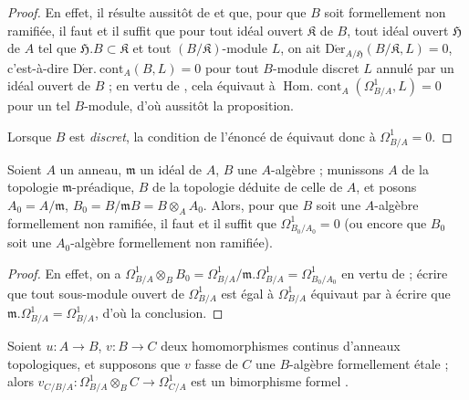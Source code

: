 \begin{proof}
En effet, il résulte aussitôt de  et
 que, pour que $B$ soit formellement non ramifiée, il faut et
il suffit que pour tout idéal ouvert $\mathfrak{K}$ de $B$, tout idéal ouvert
$\mathfrak{H}$ de $A$ tel que $\mathfrak{H}.B\subset\mathfrak{K}$ et tout
$(B/\mathfrak{K})$-module $L$, on ait
$\operatorname{D\acute{e}r}_{A/\mathfrak{H}}(B/\mathfrak{K},L)=0$,
c'est-à-dire $\operatorname{D\acute{e}r.\ cont}_A(B,L)=0$ pour tout
$B$-module discret $L$ annulé par un idéal ouvert de $B$ ; en vertu de
, cela équivaut à
$\operatorname{Hom.\ cont}_A(\Omega^1_{B/A},L)=0$ pour un tel $B$-module,
d'où aussitôt la proposition.

Lorsque $B$ est \emph{discret}, la condition de l'énoncé de
 équivaut donc à $\Omega^1_{B/A}=0$.
\end{proof}

\begin{corollary}[20.7.5]
\label{0.20.7.5-fr}
Soient $A$ un anneau, $\mathfrak{m}$ un idéal de $A$, $B$ une $A$-algèbre ;
munissons $A$ de la topologie $\mathfrak{m}$-préadique, $B$ de la topologie
déduite de celle de $A$, et posons $A_0=A/\mathfrak{m}$,
$B_0=B/\mathfrak{m}B=B\otimes_A A_0$. Alors, pour que $B$ soit une
$A$-algèbre formellement non ramifiée, il faut et il suffit que
$\Omega^1_{B_0/A_0}=0$ \textup{(ou encore que $B_0$ soit une} $A_0$-algèbre
formellement non ramifiée).
\end{corollary}

\begin{proof}
En effet, on a
$\Omega^1_{B/A}\otimes_B B_0=\Omega^1_{B/A}/\mathfrak{m}.\Omega^1_{B/A}
=\Omega^1_{B_0/A_0}$ en vertu de  ; écrire que tout
sous-module ouvert de $\Omega^1_{B/A}$ est égal à $\Omega^1_{B/A}$ équivaut
par  à écrire que
$\mathfrak{m}.\Omega^1_{B/A}=\Omega^1_{B/A}$, d'où la conclusion.
\end{proof}

\begin{proposition}[20.7.6]
\label{0.20.7.6-fr}
Soient $u:A\to B$, $v:B\to C$ deux homomorphismes continus d'anneaux
topologiques, et supposons que $v$ fasse de $C$ une $B$-algèbre formellement
étale ; alors $v_{C/B/A}:\Omega^1_{B/A}\otimes_B C\to\Omega^1_{C/A}$ est un
bimorphisme formel \textup{}.
\end{proposition}

